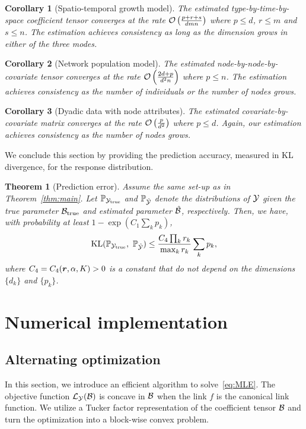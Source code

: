 \documentclass[12pt]{article}
\theoremstyle{plain}
\newtheorem{thm}{Theorem}[section]
\newtheorem{cor}{Corollary}[section]
\theoremstyle{definition}
\begin{document}
\begin{cor}[Spatio-temporal growth model] The estimated type-by-time-by-space coefficient tensor converges at the rate $\mathcal{O}\left({p+r+s\over dmn}\right)$ where $p\leq d$, $r\leq m$ and $s\leq n$. The estimation achieves consistency as long as the dimension grows in either of the three modes.
\end{cor}

\begin{cor} [Network population model] The estimated node-by-node-by-covariate tensor converges at the rate $\mathcal{O}\left({2d+p\over d^2n}\right)$ where $p\leq n$. The estimation achieves consistency as the number of individuals or the number of nodes grows. 
\end{cor}

\begin{cor} [Dyadic data with node attributes] The estimated covariate-by-covariate matrix converges at the rate $\mathcal{O}\left({p\over d^2}\right)$ where $p\leq d$. Again, our estimation achieves consistency as the number of nodes grows. 
\end{cor}

We conclude this section by providing the prediction accuracy, measured in KL divergence, for the response distribution.   

\begin{thm}[Prediction error]\label{thm:KL}
Assume the same set-up as in Theorem~\ref{thm:main}. Let $\mathbb{P}_{\mathcal{Y}_{\text{true}}}$ and $\mathbb{P}_{\hat {\mathcal{Y}}}$ denote the distributions of $\mathcal{Y}$ given the true parameter $\mathcal{B}_{\text{true}}$ and estimated parameter $\hat {\mathcal{B}}$, respectively. Then, we have, with probability at least $1-\exp(C_1\sum_k p_k)$,
\[
\text{KL}(\mathbb{P}_{\tY_{\text{true}}},\ \mathbb{P}_{\hat \tY})\leq \frac{ C_{4}\prod_kr_k}{\max_k r_k} \sum_k p_k,
\]
where $C_4=C_4(\bm{r},\alpha, K)>0$ is a constant that do not depend on the dimensions $\{d_k\}$ and $\{p_k\}$.
\end{thm}




\section{Numerical implementation}
\subsection{Alternating optimization} \label{subsec:alg}
In this section, we introduce an efficient algorithm to solve~\eqref{eq:MLE}. The objective function $\mathcal{L}_{\mathcal{Y}}(\mathcal{B})$ is concave in $\mathcal{B}$ when the link $f$ is the canonical link function. We utilize a Tucker factor representation of the coefficient tensor $\mathcal{B}$ and turn the optimization into a block-wise convex problem. 
\end{document}
